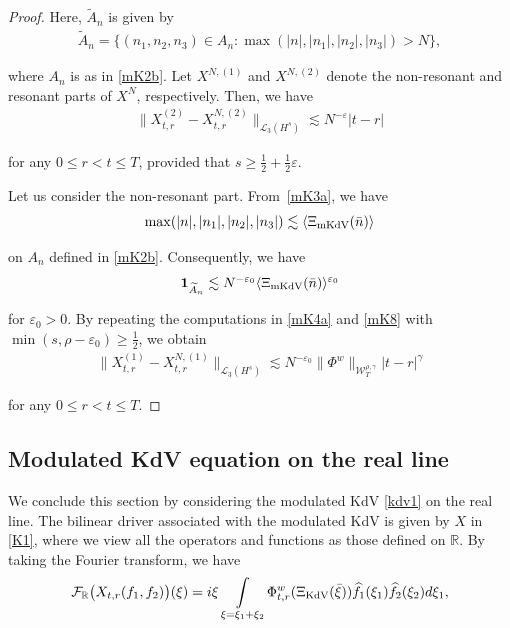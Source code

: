 \documentclass[letterpaper, 11pt,  reqno]{amsart}
\DeclareMathOperator*{\intt}{\int}
\newcommand{\1}{\hspace{0.5mm}\text{I}\hspace{0.5mm}}
\newcommand{\noi}{\noindent}
\newcommand{\R}{\mathbb{R}}
\newcommand{\F}{\mathcal{F}}
\newcommand{\eps}{\varepsilon}
\newcommand{\g}{\gamma}
\newcommand{\ft}{\widehat}
\newcommand{\wt}{\widetilde}
\newcommand{\les}{\lesssim}
\newcommand{\jb}[1]
{\langle #1 \rangle}
\newcommand{\ind}{\mathbf 1}
\newcommand{\cL}{\mathcal{L}}
\newcommand{\W}{\mathcal{W}}
\newcommand{\KDV}{\text{\rm KdV} }
\newcommand{\MKDV}{\text{\rm mKdV} }
\numberwithin{equation}{section}
\numberwithin{theorem}{section}
\begin{document}
\begin{proof}
\noi
Here,  $\wt A_n$ is given by 
\begin{align*}
\wt A_n = 
\big\{(n_1, n_2,n_3)\in A_n : 
\max(|n|, |n_1|, |n_2|, |n_3|) > N\big\}, 
\end{align*}


\noi
where  $A_n$ is as in \eqref{mK2b}.
Let $X^{N, (1)}$ and $X^{N, (2)}$ denote the non-resonant and resonant 
parts of $X^N$, respectively.
Then, we have
\begin{align*}
\|X_{t,r}^{(2)}- X_{t,r}^{N, (2)} \|_{\cL_3 (H^s)}
\les N^{-\eps}
  |t-r| 
\end{align*}

\noi
for any $0 \le r <  t \le T$, 
provided that $s \ge \frac 12 + \frac 1 2\eps$.


Let us consider the non-resonant part.
From~\eqref{mK3a}, we have 
\[
\max(|n|,|n_1|,|n_2|,|n_3|)
\les \jb{\Xi_\MKDV(\bar n)}
\]


\noi
on $A_n$ defined in \eqref{mK2b}.
Consequently, we have 
\begin{align}
\ind_{\wt A_n}
\les N^{-\eps_0}\jb{\Xi_\MKDV(\bar n)}^{\eps_0}
\label{mKX1}
\end{align}

\noi
for $\eps_0 > 0$.
By repeating 
the computations in \eqref{mK4a} and \eqref{mK8}
with $\min(s, \rho- \eps_0) \ge \frac 12$, we obtain
\begin{align*}
\|X_{t,r}^{(1)}- X_{t,r}^{N, (1)} \|_{\cL_3 (H^s)}
\les N^{-\eps_0}
\| \Phi^w \|_{\W_T^{\rho,\g}}|t-r|^{\g}
\end{align*}

\noi
for any $0 \le r <  t \le T$.
\end{proof}





\subsection{Modulated KdV equation  on the real line}
\label{SUBSEC:K3}

We conclude this section by 
considering
 the  modulated KdV  \eqref{kdv1} on the real line.
The bilinear driver associated with the modulated KdV  is 
given by $X$ in \eqref{K1}, 
where we view all the operators and functions 
 as those defined on $\R$.
By taking the Fourier transform, we have
\begin{align}
\F_\R \big(X_{t,r} (f_1,f_2)\big) (\xi)
= i\xi \intt_{\xi = \xi_1 + \xi_2}
 \Phi^w_{t,r}(\Xi_\KDV (\bar \xi))
\ft f_1(\xi_1)  \ft f_2(\xi_2)d\xi_1,
\label{KR1}
\end{align}
\end{document}
